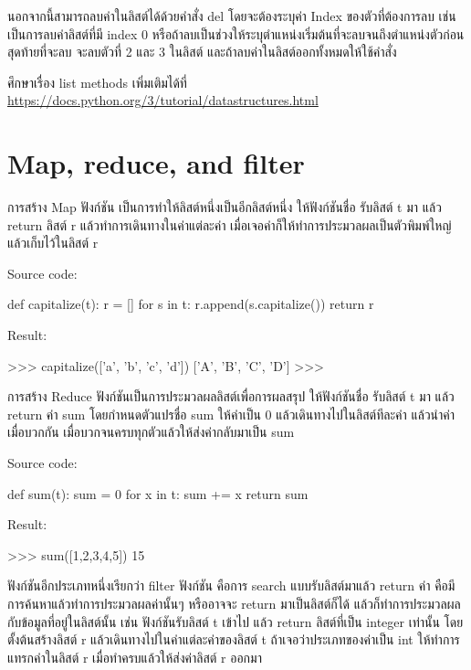 นอกจากนี้สามารถลบค่าในลิสต์ได้ด้วยคำสั่ง del โดยจะต้องระบุค่า Index ของตัวที่ต้องการลบ เช่น   เป็นการลบค่าลิสต์ที่มี index 0 หรือถ้าลบเป็นช่วงให้ระบุตำแหน่งเริ่มต้นที่จะลบจนถึงตำแหน่งตัวก่อนสุดท้ายที่จะลบ   จะลบตัวที่ 2 และ 3 ในลิสต์ และถ้าลบค่าในลิสต์ออกทั้งหมดให้ใช้คำสั่ง  

ศึกษาเรื่อง list methods เพิ่มเติมได้ที่ \url{https://docs.python.org/3/tutorial/datastructures.html}

\section{Map, reduce, and filter}

การสร้าง Map ฟังก์ชัน เป็นการทำให้ลิสต์หนึ่งเป็นอีกลิสต์หนึ่ง ให้ฟังก์ชันชื่อ   รับลิสต์ t มา แล้ว return ลิสต์ r แล้วทำการเดินทางในค่าแต่ละค่า เมื่อเจอค่าก็ให้ทำการประมวลผลเป็นตัวพิมพ์ใหญ่ แล้วเก็บไว้ในลิสต์ r

Source code:
\begin{codelist}{}{}
def capitalize(t):
    r = []
    for s in t:
        r.append(s.capitalize())
    return r
\end{codelist}

Result:
\begin{codelist}{}{}
>>> capitalize(['a', 'b', 'c', 'd'])
['A', 'B', 'C', 'D']
>>>
\end{codelist}



การสร้าง Reduce ฟังก์ชันเป็นการประมวลผลลิสต์เพื่อการผลสรุป ให้ฟังก์ชันชื่อ   รับลิสต์ t มา แล้ว return ค่า sum โดยกำหนดตัวแปรชื่อ sum ให้ค่าเป็น 0 แล้วเดินทางไปในลิสต์ทีละค่า แล้วนำค่าเมื่อบวกกัน เมื่อบวกจนครบทุกตัวแล้วให้ส่งค่ากลับมาเป็น sum

Source code:
\begin{codelist}{}{}
def sum(t):
    sum = 0
    for x in t: sum += x
    return sum
\end{codelist}

Result:
\begin{codelist}{}{}
>>> sum([1,2,3,4,5])
15
\end{codelist}


ฟังก์ชันอีกประเภทหนึ่งเรียกว่า filter ฟังก์ชัน คือการ search แบบรับลิสต์มาแล้ว return ค่า คือมีการค้นหาแล้วทำการประมวลผลค่านั้นๆ หรืออาจจะ return มาเป็นลิสต์ก็ได้ แล้วก็ทำการประมวลผลกับข้อมูลที่อยู่ในลิสต์นั้น เช่น ฟังก์ชันรับลิสต์ t เข้าไป แล้ว return ลิสต์ที่เป็น integer เท่านั้น โดยตั้งต้นสร้างลิสต์ r แล้วเดินทางไปในค่าแต่ละค่าของลิสต์ t ถ้าเจอว่าประเภทของค่าเป็น int ให้ทำการแทรกค่าในลิสต์ r เมื่อทำครบแล้วให้ส่งค่าลิสต์ r ออกมา

